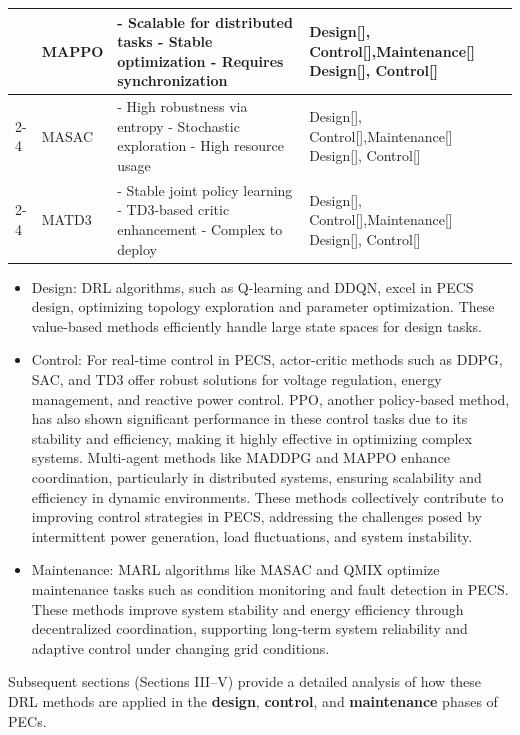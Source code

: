 \begin{table}[t]
\begin{tabular}{|l|l|p{8.2cm}|p{4.2cm}|}
& MAPPO & 
- Scalable for distributed tasks \newline
- Stable optimization \newline
- Requires synchronization 
& Design[], Control[],Maintenance[] \newline
Design[], Control[]
\\
\cline{2-4}

& MASAC & 
- High robustness via entropy \newline
- Stochastic exploration \newline
- High resource usage 
& Design[], Control[],Maintenance[] \newline
Design[], Control[]
\\
\cline{2-4}

& MATD3 & 
- Stable joint policy learning \newline
- TD3-based critic enhancement \newline
- Complex to deploy 
& Design[], Control[],Maintenance[] \newline
Design[], Control[]
\\
\hline
\end{tabular}
\end{table}


\begin{itemize}

  \item[$\bullet$] Design: DRL algorithms, such as Q-learning and DDQN, excel in PECS design, optimizing topology exploration and parameter optimization. These value-based methods efficiently handle large state spaces for design tasks. 

  \item[$\bullet$] Control: For real-time control in PECS, actor-critic methods such as DDPG, SAC, and TD3 offer robust solutions for voltage regulation, energy management, and reactive power control. PPO, another policy-based method, has also shown significant performance in these control tasks due to its stability and efficiency, making it highly effective in optimizing complex systems. Multi-agent methods like MADDPG and MAPPO enhance coordination, particularly in distributed systems, ensuring scalability and efficiency in dynamic environments. These methods collectively contribute to improving control strategies in PECS, addressing the challenges posed by intermittent power generation, load fluctuations, and system instability.

  \item[$\bullet$] Maintenance: MARL algorithms like MASAC and QMIX optimize maintenance tasks such as condition monitoring and fault detection in PECS. These methods improve system stability and energy efficiency through decentralized coordination, supporting long-term system reliability and adaptive control under changing grid conditions.

\end{itemize}

Subsequent sections (Sections III–V) provide a detailed analysis of how these DRL methods are applied in the \textbf{design}, \textbf{control}, and \textbf{maintenance} phases of PECs.

